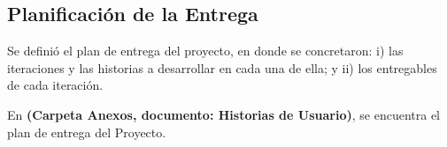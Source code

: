 \subsection{Planificación de la Entrega}

Se definió el plan de entrega del proyecto, en donde se concretaron: i) las iteraciones y las historias a desarrollar en cada una de ella; y ii) los entregables de cada iteración.

En \textbf{(Carpeta Anexos, documento: Historias de Usuario)}, se encuentra el plan de entrega del Proyecto.
